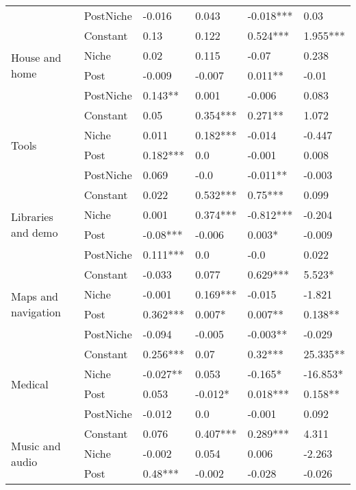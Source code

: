 \begin{table}[h!]
\begin{tabular}{llllll}
          & PostNiche &  -0.016 &  0.043 &  -0.018*** &  0.03 \\
\cline{1-6}
\multirow{4}{*}{House and home} & Constant &  0.13 &  0.122 &  0.524*** &  1.955*** \\
          & Niche &  0.02 &  0.115 &  -0.07 &  0.238 \\
          & Post &  -0.009 &  -0.007 &  0.011** &  -0.01 \\
          & PostNiche &  0.143** &  0.001 &  -0.006 &  0.083 \\
\cline{1-6}
\multirow{4}{*}{Tools} & Constant &  0.05 &  0.354*** &  0.271** &  1.072 \\
          & Niche &  0.011 &  0.182*** &  -0.014 &  -0.447 \\
          & Post &  0.182*** &  0.0 &  -0.001 &  0.008 \\
          & PostNiche &  0.069 &  -0.0 &  -0.011** &  -0.003 \\
\cline{1-6}
\multirow{4}{*}{Libraries and demo} & Constant &  0.022 &  0.532*** &  0.75*** &  0.099 \\
          & Niche &  0.001 &  0.374*** &  -0.812*** &  -0.204 \\
          & Post &  -0.08*** &  -0.006 &  0.003* &  -0.009 \\
          & PostNiche &  0.111*** &  0.0 &  -0.0 &  0.022 \\
\cline{1-6}
\multirow{4}{*}{Maps and navigation} & Constant &  -0.033 &  0.077 &  0.629*** &  5.523* \\
          & Niche &  -0.001 &  0.169*** &  -0.015 &  -1.821 \\
          & Post &  0.362*** &  0.007* &  0.007** &  0.138** \\
          & PostNiche &  -0.094 &  -0.005 &  -0.003** &  -0.029 \\
\cline{1-6}
\multirow{4}{*}{Medical} & Constant &  0.256*** &  0.07 &  0.32*** &  25.335** \\
          & Niche &  -0.027** &  0.053 &  -0.165* &  -16.853* \\
          & Post &  0.053 &  -0.012* &  0.018*** &  0.158** \\
          & PostNiche &  -0.012 &  0.0 &  -0.001 &  0.092 \\
\cline{1-6}
\multirow{4}{*}{Music and audio} & Constant &  0.076 &  0.407*** &  0.289*** &  4.311 \\
          & Niche &  -0.002 &  0.054 &  0.006 &  -2.263 \\
          & Post &  0.48*** &  -0.002 &  -0.028 &  -0.026 \\

\end{tabular}
\end{table}
